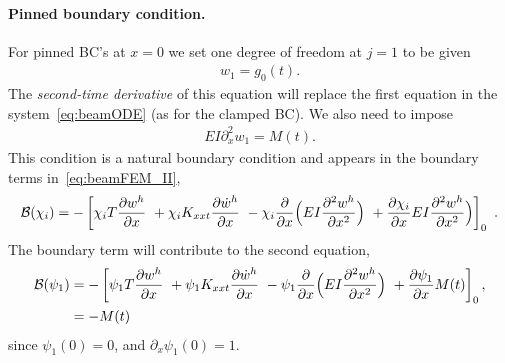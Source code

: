 \documentclass[11pt]{article}
\begin{document}
\paragraph{Pinned boundary condition.} For pinned BC's at $x=0$ we set one degree of
freedom at $j=1$ to be given
\begin{align}
  w_1 = g_0(t) .
\end{align}
The {\em second-time derivative} of this equation will replace the first equation in the system~\eqref{eq:beamODE} (as for
the clamped BC).  
We also need to impose
\begin{align}
  EI \partial_x^2 w_1 = M(t). 
\end{align}
This condition is a natural boundary condition and appears in the boundary terms in~\eqref{eq:beamFEM_II}, 
\begin{align}
   \mathcal{B}(\chi_i) = -\left[ \chi_i T \frac{\partial w^h}{\partial x} 
                     ~ + \chi_i K_{xxt} \frac{\partial \dot w^h}{\partial x}
                     ~ - \chi_i \frac{\partial}{\partial x}\Big( E I \frac{\partial^2 w^h}{\partial x^2}\Big) 
                      ~ + \frac{\partial \chi_i}{\partial x}E I \frac{\partial^2 w^h}{\partial x^2}\Big)  
                      \right]_0 ~.
\end{align}
The boundary term will contribute to the second equation, 
\begin{align}
   \mathcal{B}(\psi_1) &= -\left[ \psi_1 T \frac{\partial w^h}{\partial x} 
                      ~ + \psi_1 K_{xxt} \frac{\partial \dot w^h}{\partial x}
                      ~ - \psi_1 \frac{\partial}{\partial x}\Big( E I \frac{\partial^2 w^h}{\partial x^2}\Big) 
                      ~ + \frac{\partial \psi_1}{\partial x} M(t)  
                      \right]_0, \\
        &= -M(t) 
\end{align}
since $\psi_1(0)=0$, and $\partial_x\psi_1(0)=1$. 
\end{document}
